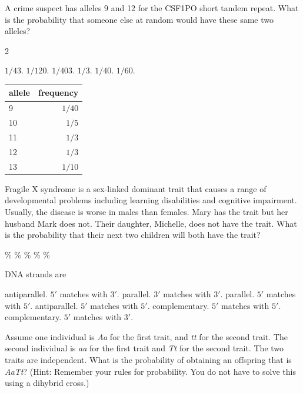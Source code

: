 \question
A crime suspect has alleles 9 and 12 for the CSF1PO short tandem repeat. What is the probability that someone else at random would have these same two alleles?  

\begin{multicols}{2}
\begin{choices}
\choice $1/43$.
\choice $1/120$.
\choice $1/403$.
\choice $1/3$.
\choice $1/40$.
\correctchoice $1/60$.
\end{choices}
\columnbreak
\begin{tabular}{lr}
\toprule
allele & frequency\\
\midrule
9 & $1/40$\\
10 & $1/5$\\
11 & $1/3$\\
12 & $1/3$\\
13 & $1/10$\\
\bottomrule
\end{tabular}
\end{multicols}

\question
Fragile X syndrome is a sex-linked dominant trait that causes a range of developmental problems including learning disabilities and cognitive impairment.  Usually, the disease is worse in males than females.  Mary has the trait but her husband Mark does not. Their daughter, Michelle, does not have the trait. What is the probability that their next two children will both have the trait?

\begin{choices}
\%
\%
\%
\%
\%
\end{choices}

\question
DNA strands are

\begin{choices}
\correctchoice antiparallel. $5'$ matches with $3'$.
\choice parallel. $3'$ matches with $3'$.
\choice parallel. $5'$ matches with $5'$.
\choice antiparallel. $5'$ matches with $5'$.
\choice complementary. $5'$ matches with $5'$.
\choice complementary. $5'$ matches with $3'$.
\end{choices}

\question
Assume one individual is \textit{Aa} for the first trait, and \textit{tt} for the second trait. The second individual is \textit{aa} for the first trait and \textit{Tt} for the second trait. The two traits are independent.  What is the probability of obtaining an offspring that is \textit{AaTt}? (Hint: Remember your rules for probability. You do not have to solve this using a dihybrid cross.)

